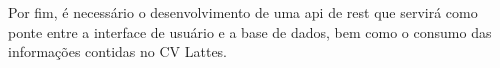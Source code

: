 Por fim, é necessário o desenvolvimento de uma \gls{api} de \gls{rest} que servirá como ponte entre a interface de usuário e a base de dados, bem como o consumo das informações contidas no CV Lattes.



